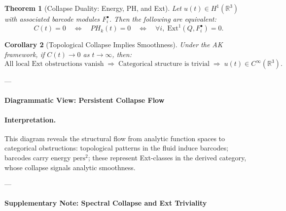 \documentclass[11pt]{article}
\newtheorem{theorem}{Theorem}[section]
\newtheorem{corollary}[theorem]{Corollary}
\begin{document}
\begin{theorem}[Collapse Duality: Energy, PH, and Ext]
Let \( u(t) \in H^1(\mathbb{R}^3) \) with associated barcode modules \( F^\bullet_i \). Then the following are equivalent:
\[
C(t) = 0 
\quad \Longleftrightarrow \quad 
PH_k(t) = 0 
\quad \Longleftrightarrow \quad 
\forall i,\; \mathrm{Ext}^1(Q, F^\bullet_i) = 0.
\]
\end{theorem}

\begin{corollary}[Topological Collapse Implies Smoothness]
Under the AK framework, if \( C(t) \to 0 \) as \( t \to \infty \), then:
\[
\text{All local Ext obstructions vanish} 
\;\Rightarrow\; 
\text{Categorical structure is trivial} 
\;\Rightarrow\; 
u(t) \in C^\infty(\mathbb{R}^3).
\]
\end{corollary}

---

\paragraph{Diagrammatic View: Persistent Collapse Flow}

\begin{center}
\end{center}

\paragraph{Interpretation.}
This diagram reveals the structural flow from analytic function spaces to categorical obstructions:  
topological patterns in the fluid induce barcodes; barcodes carry energy \( \text{pers}^2 \);  
these represent Ext-classes in the derived category, whose collapse signals analytic smoothness.

---

\paragraph{Supplementary Note: Spectral Collapse and Ext Triviality}
\end{document}
